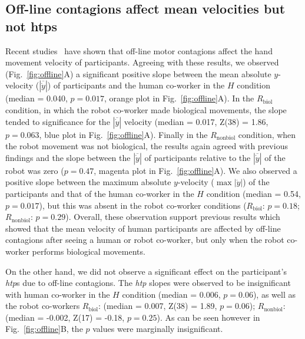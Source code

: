 \documentclass[a4paper, 12pt, oneside]{Thesis}  %
\begin{document}
\subsection{Off-line contagions affect mean velocities but not htps}

Recent studies~\cite{Noy:B&C:2009, Kilner:SocialNeuro:2007} have shown that off-line motor contagions affect the hand movement velocity of participants. Agreeing with these results, we observed (Fig.~\ref{fig:offline}A) a significant positive slope between the mean absolute $y$-velocity ($|\overline{\dot{y}}|$) of participants and the human co-worker in the $H$ condition (median = 0.040, $p = 0.017$, orange plot in Fig.~\ref{fig:offline}A). In the $R_{\text{biol}}$ condition, in which the robot co-worker made biological movements, the slope tended to significance for the $|\overline{\dot{y}}|$ velocity (median = 0.017, Z(38) = 1.86, $p = 0.063$, blue plot in Fig.~\ref{fig:offline}A). Finally in the $R_{\text{nonbiol}}$ condition, when the robot movement was not biological, the results again agreed with previous findings and the slope between the $|\overline{\dot{y}}|$ of participants relative to the $|\overline{\dot{y}}|$ of the robot was zero ($p = 0.47$, magenta plot in Fig.~\ref{fig:offline}A). We also observed a positive slope between the maximum absolute $y$-velocity ($\max |\dot{y}|$) of the participants and that of the human co-worker in the $H$ condition (median = 0.54, $p = 0.017$), but this was absent in the robot co-worker conditions ($R_{\text{biol}}$: $p = 0.18$; $R_{\text{nonbiol}}$: $p = 0.29$). Overall, these observation support previous results which showed that the mean velocity of human participants are affected by off-line contagions after seeing a human or robot co-worker, but only when the robot co-worker performs biological movements.

On the other hand, we did not observe a significant effect on the participant's {\it htp}s due to off-line contagions. The {\it htp} slopes were observed to be insignificant with human co-worker in the $H$ condition (median = 0.006, $p = 0.06$), as well as the robot co-workers $R_{\text{biol}}$: (median = 0.007, Z(38) = 1.89, $p = 0.06$); $R_{\text{nonbiol}}$: (median = -0.002, Z(17) = -0.18, $p = 0.25$). As can be seen however in Fig.~\ref{fig:offline}B, the $p$ values were marginally insignificant.
\end{document}
